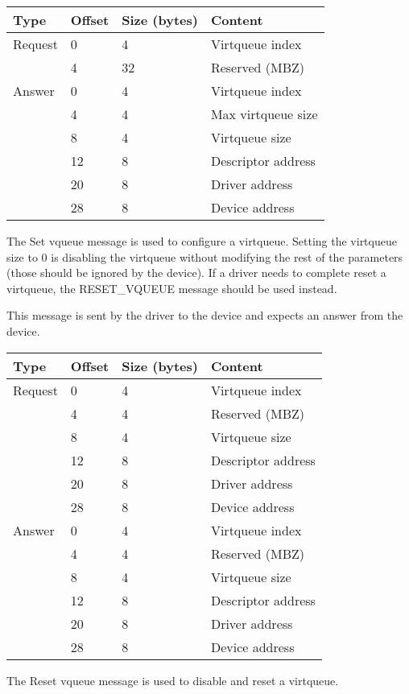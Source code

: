 \begin{tabular}{|l|l|l|l|}
\hline
Type & Offset & Size (bytes) & Content \\
\hline \hline
Request & 0 & 4 & Virtqueue index \\
& 4 & 32 & Reserved (MBZ) \\
\hline
Answer & 0 & 4 & Virtqueue index \\
& 4 & 4 & Max virtqueue size \\
& 8 & 4 & Virtqueue size \\
& 12 & 8 & Descriptor address \\
& 20 & 8 & Driver address \\
& 28 & 8 & Device address \\
\hline
\end{tabular}


The Set vqueue message is used to configure a virtqueue.
Setting the virtqueue size to 0 is disabling the virtqueue without modifying
the rest of the parameters (those should be ignored by the device).
If a driver needs to complete reset a virtqueue, the RESET\_VQUEUE message
should be used instead.

This message is sent by the driver to the device and expects an answer from the
device.

\begin{tabular}{|l|l|l|l|}
\hline
Type & Offset & Size (bytes) & Content \\
\hline \hline
Request & 0 & 4 & Virtqueue index \\
& 4 & 4 & Reserved (MBZ) \\
& 8 & 4 & Virtqueue size \\
& 12 & 8 & Descriptor address \\
& 20 & 8 & Driver address \\
& 28 & 8 & Device address \\
\hline
Answer & 0 & 4 & Virtqueue index \\
& 4 & 4 & Reserved (MBZ) \\
& 8 & 4 & Virtqueue size \\
& 12 & 8 & Descriptor address \\
& 20 & 8 & Driver address \\
& 28 & 8 & Device address \\
\hline
\end{tabular}


The Reset vqueue message is used to disable and reset a virtqueue.


